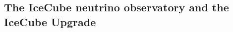 \documentclass[a4paper,11pt]{article}
\begin{document}





\subsection{The IceCube neutrino observatory and the IceCube Upgrade}
\end{document}
